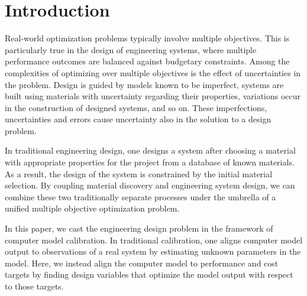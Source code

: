 \documentclass[twocolumn,10pt]{asme2ej}
\begin{document}
\section{Introduction}
\label{introduction}

Real-world optimization problems typically involve multiple objectives. 
%
This is particularly true in the design of engineering systems, where multiple performance outcomes are balanced against budgetary constraints. 
%
Among the complexities of optimizing over multiple objectives is the effect of uncertainties in the problem. 
%
Design is guided by models known to be imperfect, systems are built using materials with uncertainty regarding their properties, variations occur in the construction of designed systems, and so on. 
%
These imperfections, uncertainties and errors cause uncertainty also in the solution to a design problem. 
%

%
In traditional engineering design, one designs a system after choosing a material with appropriate properties for the project from a database of known materials. 
%
%
As a result, the design of the system is constrained by the initial material selection.
%
By coupling material discovery and engineering system design, we can combine these two traditionally separate processes under the umbrella of a unified multiple objective optimization problem.
%

%
In this paper, we cast the engineering design problem in the framework of computer model calibration.
%
In traditional calibration, one aligns computer model output to observations of a real system by estimating unknown parameters in the model.
%
Here, we instead align the computer model to performance and cost targets by finding design variables that optimize the model output with respect to those targets.
%
\end{document}
